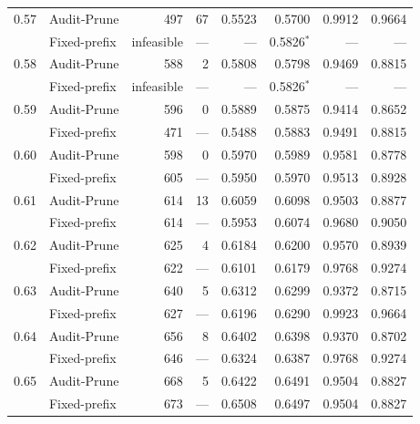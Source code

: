 \begin{table}[t]
\begin{tabular}{c l r r r r r r}
\midrule
  0.57 & Audit-Prune & 497 & 67 & 0.5523 & 0.5700 & 0.9912 & 0.9664 \\
   & Fixed-prefix & infeasible & — & — & 0.5826$^{*}$ & — & — \\
\midrule
  0.58 & Audit-Prune & 588 & 2 & 0.5808 & 0.5798 & 0.9469 & 0.8815 \\
   & Fixed-prefix & infeasible & — & — & 0.5826$^{*}$ & — & — \\
\midrule
  0.59 & Audit-Prune & 596 & 0 & 0.5889 & 0.5875 & 0.9414 & 0.8652 \\
   & Fixed-prefix & 471 & — & 0.5488 & 0.5883 & 0.9491 & 0.8815 \\
\midrule
  0.60 & Audit-Prune & 598 & 0 & 0.5970 & 0.5989 & 0.9581 & 0.8778 \\
   & Fixed-prefix & 605 & — & 0.5950 & 0.5970 & 0.9513 & 0.8928 \\
\midrule
  0.61 & Audit-Prune & 614 & 13 & 0.6059 & 0.6098 & 0.9503 & 0.8877 \\
   & Fixed-prefix & 614 & — & 0.5953 & 0.6074 & 0.9680 & 0.9050 \\
\midrule
  0.62 & Audit-Prune & 625 & 4 & 0.6184 & 0.6200 & 0.9570 & 0.8939 \\
   & Fixed-prefix & 622 & — & 0.6101 & 0.6179 & 0.9768 & 0.9274 \\
\midrule
  0.63 & Audit-Prune & 640 & 5 & 0.6312 & 0.6299 & 0.9372 & 0.8715 \\
   & Fixed-prefix & 627 & — & 0.6196 & 0.6290 & 0.9923 & 0.9664 \\
\midrule
  0.64 & Audit-Prune & 656 & 8 & 0.6402 & 0.6398 & 0.9370 & 0.8702 \\
   & Fixed-prefix & 646 & — & 0.6324 & 0.6387 & 0.9768 & 0.9274 \\
\midrule
  0.65 & Audit-Prune & 668 & 5 & 0.6422 & 0.6491 & 0.9504 & 0.8827 \\
   & Fixed-prefix & 673 & — & 0.6508 & 0.6497 & 0.9504 & 0.8827 \\
\bottomrule
\end{tabular}
\end{table}
